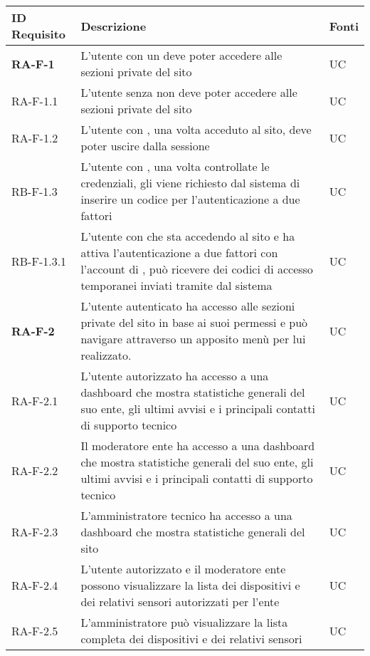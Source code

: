 	\begin{center}
		\begin{longtable}{|p{3cm}|p{9.85cm}|p{2cm}|}
		\hline
		\rowcolor{red_requisiti}
		{\color{white} \textbf{ID Requisito} } & {\color{white} \textbf{Descrizione} } & {\color{white} \textbf{Fonti} } \\ 
		\hline
		\endhead

		\textbf{RA-F-1} & L'utente con un \glock{account valido} deve poter accedere alle sezioni private del sito & UC \\ \hline
		{\color{gray} RA-F-}1.1 & L'utente senza \glock{account valido} non deve poter accedere alle sezioni private del sito & UC \\ \hline
		{\color{gray} RA-F-}1.2 & L'utente con \glock{account valido}, una volta acceduto al sito, deve poter uscire dalla sessione & UC \\ \hline
		{\color{gray} RB-F-}1.3 & L'utente con \glock{account valido}, una volta controllate le credenziali, gli viene richiesto dal sistema di inserire un codice per l'autenticazione a due fattori & UC \\ \hline
		{\color{gray} RB-F-}1.3.1 & L'utente con \glock{account valido} che sta accedendo al sito e ha attiva l'autenticazione a due fattori con l'account di \glock{Telegram}, può ricevere dei codici di accesso temporanei inviati tramite \glock{Telegram} dal sistema & UC \\ \hline
		
		\textbf{RA-F-2} & L'utente autenticato ha accesso alle sezioni private del sito in base ai suoi permessi e può navigare attraverso un apposito menù per lui realizzato. & UC \\ \hline 
		{\color{gray} RA-F-}2.1 & L'utente autorizzato ha accesso a una dashboard che mostra statistiche generali del suo ente, gli ultimi avvisi e i principali contatti di supporto tecnico & UC \\ \hline
		{\color{gray} RA-F-}2.2 & Il moderatore ente ha accesso a una dashboard che mostra statistiche generali del suo ente, gli ultimi avvisi e i principali contatti di supporto tecnico & UC \\ \hline
		{\color{gray} RA-F-}2.3 & L'amministratore tecnico ha accesso a una dashboard che mostra statistiche generali del sito & UC \\ \hline
		
		{\color{gray} RA-F-}2.4 & L'utente autorizzato e il moderatore ente possono visualizzare la lista dei dispositivi e dei relativi sensori autorizzati per l'ente & UC \\ \hline
		{\color{gray} RA-F-}2.5 & L'amministratore può visualizzare la lista completa dei dispositivi e dei relativi sensori & UC \\ \hline


\end{longtable}
\end{center}
